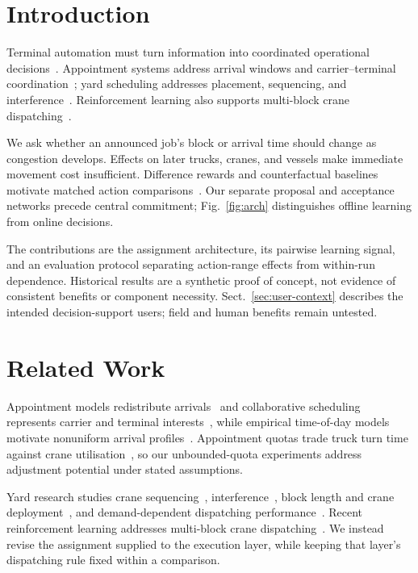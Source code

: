 \documentclass[a4paper]{llncs}
\begin{document}
\section{Introduction}
\label{sec:intro}
Terminal automation must turn information into coordinated operational
decisions~\cite{ref1}. Appointment systems address arrival windows and
carrier--terminal coordination~\cite{ref4,ref6}; yard scheduling addresses
placement, sequencing, and interference~\cite{ref7,ref8,ref9,ref16}.
Reinforcement learning also supports multi-block crane dispatching~\cite{ref19}.

We ask whether an announced job's block or arrival time should change
as congestion develops. Effects on later trucks, cranes, and vessels
make immediate movement cost insufficient. Difference rewards and
counterfactual baselines motivate matched action comparisons~\cite{ref10,ref11}.
Our separate proposal and acceptance networks precede central commitment;
Fig.~\ref{fig:arch} distinguishes offline learning from online decisions.

The contributions are the assignment architecture, its pairwise
learning signal, and an evaluation protocol separating action-range
effects from within-run dependence. Historical results are a synthetic
proof of concept, not evidence of consistent benefits or component
necessity. Sect.~\ref{sec:user-context} describes the intended
decision-support users; field and human benefits remain untested.

\section{Related Work}
\label{sec:related}
Appointment models redistribute arrivals~\cite{ref4} and collaborative
scheduling represents carrier and terminal interests~\cite{ref6}, while
empirical time-of-day models motivate nonuniform arrival
profiles~\cite{ref13}. Appointment quotas trade truck turn time against
crane utilisation~\cite{refquota}, so our unbounded-quota experiments
address adjustment potential under stated assumptions.

Yard research studies crane sequencing~\cite{ref7},
interference~\cite{ref8}, block length and crane deployment~\cite{ref9},
and demand-dependent dispatching performance~\cite{ref16}. Recent
reinforcement learning addresses multi-block crane
dispatching~\cite{ref19}. We instead revise the assignment supplied to
the execution layer, while keeping that layer's dispatching rule fixed
within a comparison.
\end{document}
